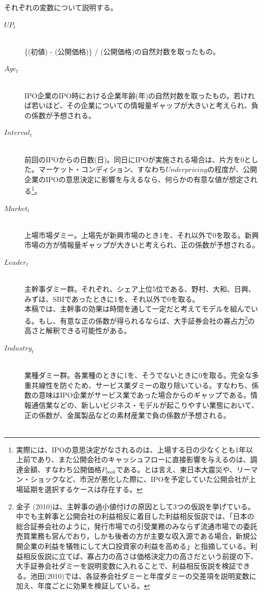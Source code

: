 \documentclass{jsarticle}
\begin{document}
それぞれの変数について説明する。\\ \par
\begin{description}
 \item[$UP_t$]\mbox{}\\ 
 \{(初値) - (公開価格)\} / (公開価格)の自然対数を取ったもの。
  \item[$Age_t$]\mbox{}\\
  IPO企業のIPO時における企業年齢(年)の自然対数を取ったもの。若ければ若いほど、その企業についての情報量ギャップが大きいと考えられ、負の係数が予想される。
  \item[$Interval_t$]\mbox{}\\
  前回のIPOからの日数(日)。同日にIPOが実施される場合は、片方を0とした。マーケット・コンディション、すなわち$Underpricing$の程度が、公開企業のIPOの意思決定に影響を与えるなら、何らかの有意な値が想定される\footnote[15]{実際には、IPOの意思決定がなされるのは、上場する日の少なくとも1年以上前であり、また公開会社のキャッシュフローに直接影響を与えるのは、調達金額、すなわち公開価格$P_{book}$である。とは言え、東日本大震災や、リーマン・ショックなど、市況が悪化した際に、IPOを予定していた公開会社が上場延期を選択するケースは存在する。}。
  \item[$Market_t$]\mbox{}\\
  上場市場ダミー。上場先が新興市場のとき1を、それ以外で0を取る。新興市場の方が情報量ギャップが大きいと考えられ、正の係数が予想される。
  \item[$Leader_t$]\mbox{}\\
  主幹事ダミー群。それぞれ、シェア上位5位である、野村、大和、日興、みずほ、SBIであったときに1を、それ以外で0を取る。\\
  本稿では、主幹事の効果は時間を通して一定だと考えてモデルを組んでいる。もし、有意な正の係数が得られるならば、大手証券会社の寡占力\footnote[16]{金子 (2010)\cite{kaneko}は、主幹事の過小値付けの原因として3つの仮説を挙げている。中でも主幹事と公開会社の利益相反に着目した利益相反仮説では、「日本の総合証券会社のように，発行市場での引受業務のみならず流通市場での委託売買業務も営んでおり，しかも後者の方が主要な収入源である場合，新規公開企業の利益を犠牲にして大口投資家の利益を高める」と指摘している。利益相反仮説に立てば、寡占力の高さは価格決定力の高さだという前提の下、大手証券会社ダミーを説明変数に入れることで、利益相反仮説を検証できる。池田(2010)\cite{ikeda2}では、各証券会社ダミーと年度ダミーの交差項を説明変数に加え、年度ごとに効果を検証している。}の高さと解釈できる可能性がある。
  \item[$Industry_t$]\mbox{}\\
  業種ダミー群。各業種のときに1を、そうでないときに0を取る。完全な多重共線性を防ぐため、サービス業ダミーの取り除いている。すなわち、係数の意味はIPO企業がサービス業であった場合からのギャップである。情報通信業などの、新しいビジネス・モデルが起こりやすい業態において、正の係数が、金属製品などの素材産業で負の係数が予想される。\\ \\ 
\end{description}
\end{document}
